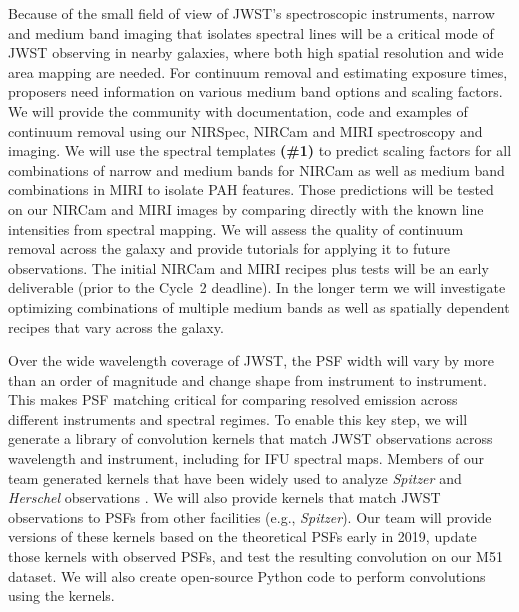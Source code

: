 \documentclass[12pt]{article}
\begin{document}
\vspace{0.05in}

 Because of the small field of view of JWST's spectroscopic instruments, narrow and medium band imaging that isolates spectral lines will be a critical mode of JWST observing in nearby galaxies, where both high spatial resolution and wide area mapping are needed. For continuum removal and estimating exposure times, proposers need information on various medium band options and scaling factors. We will provide the community with documentation, code and examples of continuum removal using our NIRSpec, NIRCam and MIRI spectroscopy and imaging. We will use the spectral templates {\bf (\#1)} to predict scaling factors for all combinations of narrow and medium bands for NIRCam as well as medium band combinations in MIRI to isolate PAH features.  Those predictions will be tested on our NIRCam and MIRI images by comparing directly with the known line intensities from spectral mapping.  We will assess the quality of continuum removal across the galaxy and provide tutorials for applying it to future observations.  The initial NIRCam and MIRI recipes plus tests will be an early deliverable (prior to the Cycle~2 deadline).  In the longer term we will investigate optimizing combinations of multiple medium bands as well as spatially dependent recipes that vary across the galaxy.



\vspace{0.05in} 

  Over the wide wavelength coverage of JWST, the PSF width will vary by more than an order of magnitude and change shape from instrument to instrument. This makes PSF matching critical for comparing resolved emission across different instruments and spectral regimes. To enable this key step, we will generate a library of convolution kernels that match JWST observations across wavelength and instrument, including for IFU spectral maps.  Members of our team generated kernels that have been widely used to analyze {\em Spitzer} and {\em Herschel} observations \citep{gordon2008,sandstrom2009,aniano2011}. We will also provide kernels that match JWST observations to PSFs from other facilities (e.g., {\em Spitzer}).  Our team will provide versions of these kernels based on the theoretical PSFs early in 2019, update those kernels with observed PSFs, and test the resulting convolution on our M51 dataset.  We will also create open-source Python code to perform convolutions using the kernels.
\end{document}
